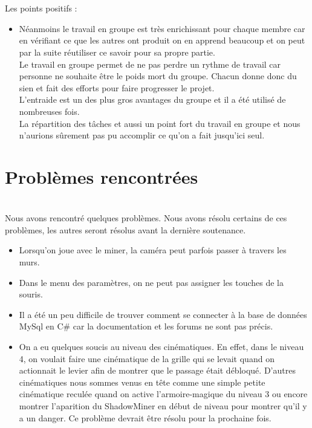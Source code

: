 \documentclass[titlepage, 13px, a4paper]{report}
\begin{document}
\paragraph{} \hspace{0pt} \\
Les points positifs :
{\begin{itemize}
	\item	Néanmoins le travail en groupe est très enrichissant pour chaque membre car en vérifiant ce que les autres ont produit 
		on en apprend beaucoup et on peut par la suite réutiliser ce savoir pour sa propre partie. \\
		Le travail en groupe permet de ne pas perdre un rythme de travail car personne ne souhaite être le poids mort du groupe. 
		Chacun donne donc du sien et fait des efforts pour faire progresser le projet. \\
		L’entraide est un des plus gros avantages du groupe et il a été utilisé de nombreuses fois. \\
		La répartition des tâches et aussi un point fort du travail en groupe et nous n'aurions sûrement 
		pas pu accomplir ce qu'on a fait jusqu'ici seul. \\
\end{itemize}} 






\newpage
\section{Problèmes rencontrées}
\paragraph{} \hspace{0pt} \\
Nous avons rencontré quelques problèmes. Nous avons résolu certains de ces problèmes, les autres seront résolus avant la dernière soutenance.

{\begin{itemize}
	\item Lorsqu’on joue avec le miner, la caméra peut parfois passer à travers les murs. \\
	\item Dans le menu des paramètres, on ne peut pas assigner les touches de la souris. \\
	\item Il a été un peu difficile de trouver comment se connecter à la base de données MySql en C\# car 
		la documentation et les forums ne sont pas précis. \\
	\item  On a eu quelques soucis au niveau des cinématiques. En effet, dans le niveau 4, on voulait faire une cinématique de la grille 
	qui se levait quand on actionnait le levier afin de montrer que le passage était débloqué. D’autres cinématiques nous sommes venus 
	en tête comme une simple petite cinématique reculée quand on active l’armoire-magique du niveau 3 ou encore montrer l'aparition du 
	ShadowMiner en début de niveau pour montrer qu'il y a un danger. Ce problème devrait être résolu pour la prochaine fois.
\end{itemize}} 
\end{document}
